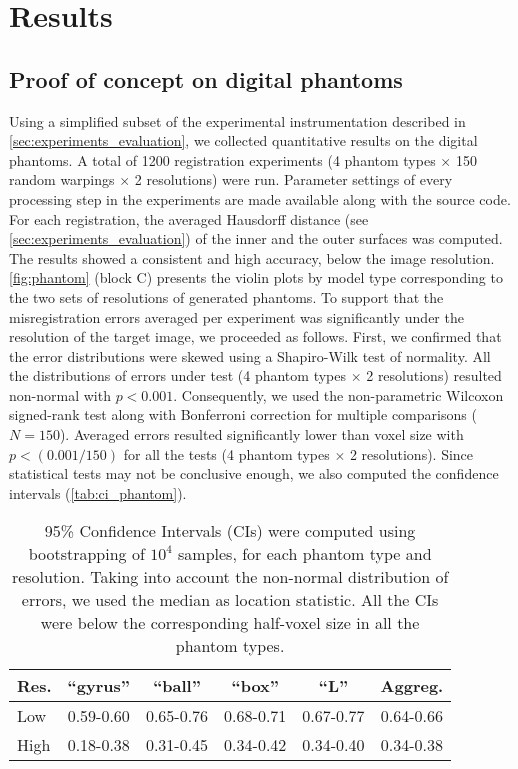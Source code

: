 \section{Results}
\label{sec:results}

\subsection{Proof of concept on digital phantoms}
\label{sec:results_phantom}
Using a simplified subset of the experimental instrumentation described in
  \autoref{sec:experiments_evaluation}, we collected quantitative results on the digital
  phantoms.
A total of 1200 registration experiments (4 phantom types $\times$ 150 random warpings
  $\times$ 2 resolutions) were run.
Parameter settings of every processing step in the experiments are made available along with
  the source code.
For each registration, the averaged Hausdorff distance (see \autoref{sec:experiments_evaluation})
  of the inner and the outer surfaces was computed.
The results showed a consistent and high accuracy, below the image resolution.
\autoref{fig:phantom} (block C) presents the violin plots by model type corresponding
  to the two sets of resolutions of generated phantoms.
To support that the misregistration errors averaged per experiment was significantly
  under the resolution of the target image, we proceeded as follows.
First, we confirmed that the error distributions were skewed using a Shapiro-Wilk test of
  normality.
All the distributions of errors under test (4 phantom types $\times$ 2 resolutions) resulted
  non-normal with $p<0.001$.
Consequently, we used the non-parametric Wilcoxon signed-rank test along with Bonferroni
  correction for multiple comparisons ($N=150$).
Averaged errors resulted significantly lower than voxel size with $p < (0.001 / 150)$
  for all the tests (4 phantom types $\times$ 2 resolutions).
Since statistical tests may not be conclusive enough, we also computed the confidence intervals
  (\autoref{tab:ci_phantom}).


\begin{table}
		\centering
		\footnotesize
    \begin{tabular}{lccccc}
    Res. & ``gyrus'' & ``ball''  & ``box''   & ``L''     & Aggreg.    \\\hline
    Low  & 0.59-0.60 & 0.65-0.76 & 0.68-0.71 & 0.67-0.77 & 0.64-0.66  \\
    High & 0.18-0.38 & 0.31-0.45 & 0.34-0.42 & 0.34-0.40 & 0.34-0.38  \\
    \hline
    \end{tabular}
    \caption{95\% Confidence Intervals (CIs) were computed using bootstrapping of $10^4$ samples,
      for each phantom type and resolution.
    Taking into account the non-normal distribution of errors, we used the median as location
  		statistic.
    All the CIs were below the corresponding half-voxel size in all the phantom types.}\label{tab:ci_phantom}
\end{table}

